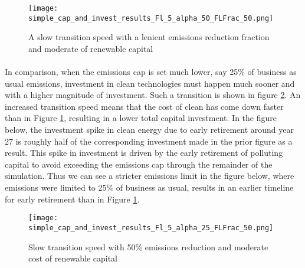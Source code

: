 \documentclass{article}
\begin{document}
\begin{figure}[h]
\texttt{[image: simple\_cap\_and\_invest\_results\_Fl\_5\_alpha\_50\_FLFrac\_50.png]}
\caption{A slow transition speed with a lenient emissions reduction fraction and moderate of renewable capital\label{fig:SimpleResultsA=50}}
\end{figure}



\FloatBarrier


\paragraph{} In comparison, when the emissions cap is set much lower, say 25\% of business as usual emissions, investment in clean technologies must happen much sooner and with a higher magnitude of investment. Such a transition is shown in figure \ref{fig:SimpleResultsA=25}. An increased transition speed means that the cost of clean has come down faster than in Figure \ref{fig:SimpleResultsA=50}, resulting in a lower total capital investment. In the figure below, the investment spike in clean energy due to early retirement around year 27 is roughly half of the corresponding investment made in the prior figure as a result. This spike in investment is driven by the early retirement of polluting capital to avoid exceeding the emissions cap through the remainder of the simulation. Thus we can see a stricter emissions limit in the figure below, where emissions were limited to 25\% of business as usual, results in an earlier timeline for early retirement than in Figure \ref{fig:SimpleResultsA=50}.

\begin{figure}[h]
\texttt{[image: simple\_cap\_and\_invest\_results\_Fl\_5\_alpha\_25\_FLFrac\_50.png]}
\caption{Slow transition speed with 50\% emissions reduction and moderate cost of renewable capital\label{fig:SimpleResultsA=25}}
\end{figure}


\FloatBarrier

\end{document}

